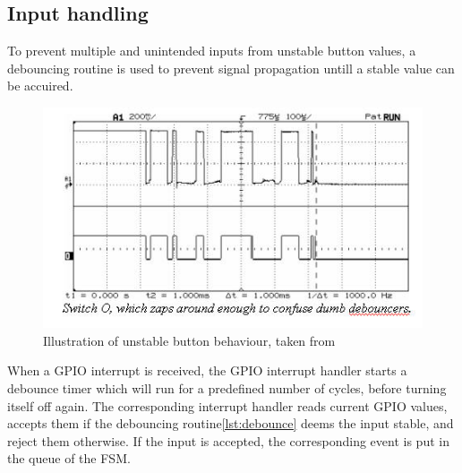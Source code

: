 \subsection{Input handling}
To prevent multiple and unintended inputs from unstable button values, a debouncing routine is used to prevent signal propagation untill a stable value can be accuired.

\begin{figure}[h]
    \includegraphics{figures/debounceswitcho.jpg}
    \caption{Illustration of unstable button behaviour, taken from \cite{debouncer}}
\end{figure}
When a GPIO interrupt is received, the GPIO interrupt handler starts a debounce timer which will run for a predefined number of cycles, before turning itself off again.
The corresponding interrupt handler reads current  GPIO values, accepts them if the debouncing routine\ref{lst:debounce} deems the input stable, and reject them otherwise.
If the input is accepted, the corresponding event is put in the queue of the FSM.



